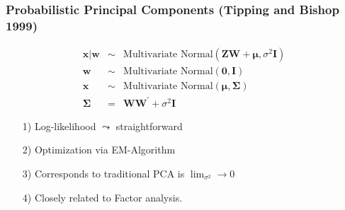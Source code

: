 \documentclass{beamer}
\numberwithin{equation}{section}
\begin{document}
\begin{frame}
\frametitle{Probabilistic Principal Components (Tipping and Bishop 1999)}

\begin{eqnarray}
\boldsymbol{x}|\boldsymbol{w} & \sim & \text{Multivariate Normal}(\boldsymbol{Z}\boldsymbol{W} + \boldsymbol{\mu}, \sigma^2 \boldsymbol{I}) \nonumber \\
\boldsymbol{w} & \sim & \text{Multivariate Normal} (\boldsymbol{0}, \boldsymbol{I}) \nonumber \\
\boldsymbol{x} & \sim & \text{Multivariate Normal} (\boldsymbol{\mu}, \boldsymbol{\Sigma}) \nonumber \\
\boldsymbol{\Sigma} & = & \boldsymbol{W}\boldsymbol{W}^{'} + \sigma^2\boldsymbol{I} \nonumber
\end{eqnarray}

\begin{itemize}
\item[1)] Log-likelihood $\leadsto$ straightforward
\item[2)] Optimization via \alert{EM}-Algorithm
\item[3)] Corresponds to traditional PCA is $\lim_{\sigma^2} \rightarrow 0 $
\item[4)] Closely related to Factor analysis.
\end{itemize}





\end{frame}
\end{document}
